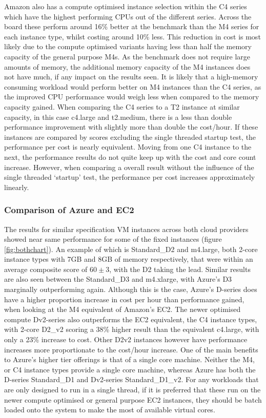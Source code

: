 \documentclass{llncs}
\begin{document}
Amazon also has a compute optimised instance selection within the C4 series which have the highest performing CPUs out of the different series. Across the board these perform around 16\% better at the benchmark than the M4 series for each instance type, whilst costing around 10\% less. This reduction in cost is most likely due to the compute optimised variants having less than half the memory capacity of the general purpose M4s. As the benchmark does not require large amounts of memory, the additional memory capacity of the M4 instances does not have much, if any impact on the results seen. It is likely that a high-memory consuming workload would perform better on M4 instances than the C4 series, as the improved CPU performance would weigh less when compared to the memory capacity gained. When comparing the C4 series to a T2 instance at similar capacity, in this case c4.large and t2.medium, there is a less than double performance improvement with slightly more than double the cost/hour. If these instances are compared by scores excluding the single threaded startup test, the performance per cost is nearly equivalent. Moving from one C4 instance to the next, the performance results do not quite keep up with the cost and core count increase. However, when comparing a overall result without the influence of the single threaded `startup' test, the performance per cost increases approximately linearly.


\subsubsection{Comparison of Azure and EC2}

The results for similar specification VM instances across both cloud providers showed near same performance for some of the fixed instances (figure \ref{fig:bothchart}). An example of which is Standard\_D2 and m4.large, both 2-core instance types with 7GB and 8GB of memory respectively, that were within an average composite score of $60\pm3$, with the D2 taking the lead. Similar results are also seen between the Standard\_D3 and m4.xlarge, with Azure's D3 marginally outperforming again. Although this is the case, Azure's D-series does have a higher proportion increase in cost per hour than performance gained, when looking at the M4 equivalent of Amazon's EC2. The newer optimised compute Dv2-series also outperforms the EC2 equivalent, the C4 instance types, with 2-core D2\_v2 scoring a 38\% higher result than the equivalent c4.large, with only a 23\% increase to cost. Other D2v2 instances however have performance increases more proportionate to the cost/hour increase. One of the main benefits to Azure's higher tier offerings is that of a single core machine. Neither the M4, or C4 instance types provide a single core machine, whereas Azure has both the D-series Standard\_D1 and Dv2-series Standard\_D1\_v2. For any workloads that are only designed to run in a single thread, if it is preferred that these run on the newer compute optimised or general purpose EC2 instances, they should be batch loaded onto the system to make the most of available virtual cores.
\end{document}
